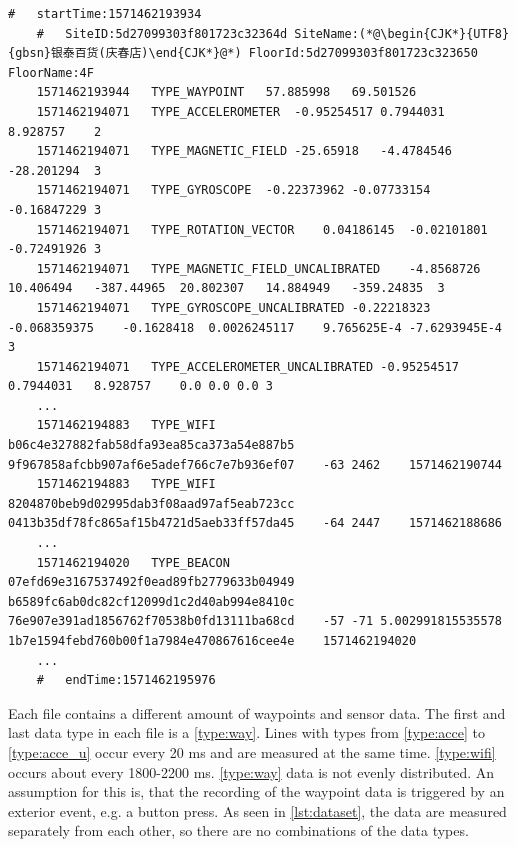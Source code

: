 
\begin{lstlisting}[caption={A snippet from the dataset of a file of the floor F4 of the site with the ID 5d27099303f801723c32364d},label={lst:dataset},captionpos=b]
    #	startTime:1571462193934
    #	SiteID:5d27099303f801723c32364d	SiteName:(*@\begin{CJK*}{UTF8}{gbsn}银泰百货(庆春店)\end{CJK*}@*) FloorId:5d27099303f801723c323650	FloorName:4F
    1571462193944	TYPE_WAYPOINT	57.885998	69.501526
    1571462194071	TYPE_ACCELEROMETER	-0.95254517	0.7944031	8.928757	2
    1571462194071	TYPE_MAGNETIC_FIELD	-25.65918	-4.4784546	-28.201294	3
    1571462194071	TYPE_GYROSCOPE	-0.22373962	-0.07733154	-0.16847229	3
    1571462194071	TYPE_ROTATION_VECTOR	0.04186145	-0.02101801	-0.72491926	3
    1571462194071	TYPE_MAGNETIC_FIELD_UNCALIBRATED	-4.8568726	10.406494	-387.44965	20.802307	14.884949	-359.24835	3
    1571462194071	TYPE_GYROSCOPE_UNCALIBRATED	-0.22218323	-0.068359375	-0.1628418	0.0026245117	9.765625E-4	-7.6293945E-4	3
    1571462194071	TYPE_ACCELEROMETER_UNCALIBRATED	-0.95254517	0.7944031	8.928757	0.0	0.0	0.0	3
    ...
    1571462194883	TYPE_WIFI	b06c4e327882fab58dfa93ea85ca373a54e887b5	9f967858afcbb907af6e5adef766c7e7b936ef07	-63	2462	1571462190744
    1571462194883	TYPE_WIFI	8204870beb9d02995dab3f08aad97af5eab723cc	0413b35df78fc865af15b4721d5aeb33ff57da45	-64	2447	1571462188686
    ...
    1571462194020	TYPE_BEACON	07efd69e3167537492f0ead89fb2779633b04949	b6589fc6ab0dc82cf12099d1c2d40ab994e8410c	76e907e391ad1856762f70538b0fd13111ba68cd	-57	-71	5.002991815535578	1b7e1594febd760b00f1a7984e470867616cee4e	1571462194020
    ...
    #	endTime:1571462195976
\end{lstlisting}

Each file contains a different amount of waypoints and sensor data.
The first and last data type in each file is a \ref{type:way}.
Lines with types from \ref{type:acce} to \ref{type:acce_u} occur every 20 ms and are measured at the same time.
\ref{type:wifi} occurs about every 1800-2200 ms.
\ref{type:way} data is not evenly distributed.
An assumption for this is, that the recording of the waypoint data is triggered by an exterior event, e.g. a button press.
As seen in \cref{lst:dataset}, the data are measured separately from each other, so there are no combinations of the data types.

